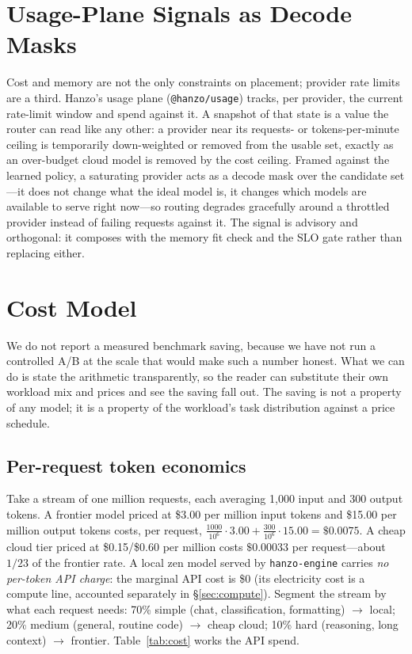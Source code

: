 \documentclass[11pt]{article}
\begin{document}
\section{Usage-Plane Signals as Decode Masks}
\label{sec:usage}

Cost and memory are not the only constraints on placement; provider rate limits
are a third. Hanzo's usage plane (\texttt{@hanzo/usage}) tracks, per provider,
the current rate-limit window and spend against it. A snapshot of that state is
a value the router can read like any other: a provider near its requests- or
tokens-per-minute ceiling is temporarily down-weighted or removed from the
usable set, exactly as an over-budget cloud model is removed by the cost
ceiling. Framed against the learned policy, a saturating provider acts as a
decode mask over the candidate set---it does not change what the ideal model is,
it changes which models are available to serve right now---so routing degrades
gracefully around a throttled provider instead of failing requests against it.
The signal is advisory and orthogonal: it composes with the memory fit check and
the SLO gate rather than replacing either.

\section{Cost Model}
\label{sec:cost}

We do not report a measured benchmark saving, because we have not run a
controlled A/B at the scale that would make such a number honest. What we can do
is state the arithmetic transparently, so the reader can substitute their own
workload mix and prices and see the saving fall out. The saving is not a
property of any model; it is a property of the workload's task distribution
against a price schedule.

\subsection{Per-request token economics}

Take a stream of one million requests, each averaging 1{,}000 input and 300
output tokens. A frontier model priced at \$3.00 per million input tokens and
\$15.00 per million output tokens costs, per request,
$\tfrac{1000}{10^6}\!\cdot\!3.00 + \tfrac{300}{10^6}\!\cdot\!15.00 = \$0.0075$.
A cheap cloud tier priced at \$0.15/\$0.60 per million costs $\$0.00033$ per
request---about $1/23$ of the frontier rate. A local zen model served by
\texttt{hanzo-engine} carries \emph{no per-token API charge}: the marginal API
cost is \$0 (its electricity cost is a compute line, accounted separately in
\S\ref{sec:compute}). Segment the stream by what each request needs: 70\% simple
(chat, classification, formatting) $\to$ local; 20\% medium (general, routine
code) $\to$ cheap cloud; 10\% hard (reasoning, long context) $\to$ frontier.
Table~\ref{tab:cost} works the API spend.
\end{document}
